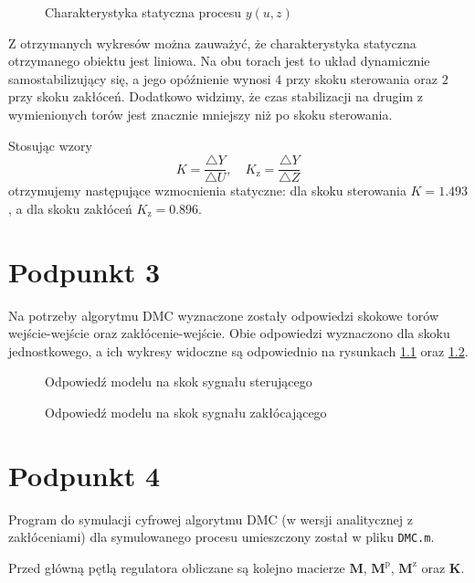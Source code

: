 \begin{figure}[ht]
\centering

\caption{Charakterystyka statyczna procesu $y(u,z)$}
\label{Z2c}
\end{figure}


Z otrzymanych wykresów można zauważyć, że charakterystyka statyczna otrzymanego obiektu jest liniowa. Na obu torach jest to układ dynamicznie samostabilizujący się, a jego opóźnienie wynosi $ \num{4} $ przy skoku sterowania oraz $ \num{2} $ przy skoku zakłóceń. Dodatkowo widzimy, że czas stabilizacji na drugim z wymienionych torów jest znacznie mniejszy niż po skoku sterowania. 

Stosując wzory
\begin{equation}
K = \frac{ \triangle Y }{ \triangle U},\quad K_{\mathrm{z}} = \frac{\triangle Y}{\triangle Z}
\end{equation}
otrzymujemy następujące wzmocnienia statyczne: dla skoku sterowania $ K = \num{1,493} $, a dla skoku zakłóceń $ K_\mathrm{z} = \num{0,896} $.


\chapter{Podpunkt 3}
Na potrzeby algorytmu DMC wyznaczone zostały odpowiedzi skokowe torów wejście-wejście oraz zakłócenie-wejście. Obie odpowiedzi wyznaczono dla skoku jednostkowego, a ich wykresy widoczne są odpowiednio na rysunkach \ref{Z3a} oraz \ref{Z3b}.

\begin{figure}[ht]
\centering

\caption{Odpowiedź modelu na skok sygnału sterującego}
\label{Z3a}
\end{figure}

\begin{figure}[ht]
\centering

\caption{Odpowiedź modelu na skok sygnału zakłócającego}
\label{Z3b}
\end{figure}


\chapter{Podpunkt 4}
Program do symulacji cyfrowej algorytmu DMC (w wersji analitycznej z zakłóceniami) dla symulowanego procesu umieszczony został w pliku \verb+DMC.m+.

Przed główną pętlą regulatora obliczane są kolejno macierze $ \boldsymbol{M} $, $ \boldsymbol{M}^\mathrm{p}$, $ \boldsymbol{M}^\mathrm{z} $ oraz $ \boldsymbol{K} $.


